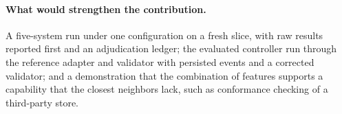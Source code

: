 \paragraph{What would strengthen the contribution.} A five-system run under one configuration on a fresh slice, with raw results reported first and an adjudication ledger; the evaluated controller run through the reference adapter and validator with persisted events and a corrected validator; and a demonstration that the combination of features supports a capability that the closest neighbors lack, such as conformance checking of a third-party store.
